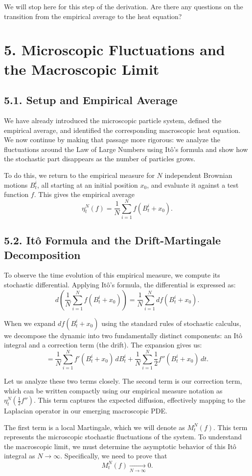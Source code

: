 \documentclass[11pt]{article}
\theoremstyle{definition}
\theoremstyle{remark}
\begin{document}
We will stop here for this step of the derivation. Are there any questions on the transition from the empirical average to the heat equation?

\section*{5. Microscopic Fluctuations and the Macroscopic Limit}
\subsection*{5.1. Setup and Empirical Average}
We have already introduced the microscopic particle system, defined the empirical average, and identified the corresponding macroscopic heat equation. We now continue by making that passage more rigorous: we analyze the fluctuations around the Law of Large Numbers using It\^o's formula and show how the stochastic part disappears as the number of particles grows.

To do this, we return to the empirical measure for $N$ independent Brownian motions $B_t^i$, all starting at an initial position $x_0$, and evaluate it against a test function $f$. This gives the empirical average
\[
\eta_t^N(f)=\frac{1}{N}\sum_{i=1}^N f(B_t^i+x_0).
\]

\subsection*{5.2. It\^o Formula and the Drift-Martingale Decomposition}
To observe the time evolution of this empirical measure, we compute its stochastic differential. Applying It\^o's formula, the differential is expressed as:
\[
d\!\left(
\frac{1}{N}\sum_{i=1}^N f(B_t^i+x_0)
\right)
=
\frac{1}{N}\sum_{i=1}^N df(B_t^i+x_0).
\]

When we expand $df(B_t^i+x_0)$ using the standard rules of stochastic calculus, we decompose the dynamic into two fundamentally distinct components: an It\^o integral and a correction term (the drift). The expansion gives us:
\[
=
\frac{1}{N}\sum_{i=1}^N f'(B_t^i+x_0)\,dB_t^i
+
\frac{1}{N}\sum_{i=1}^N \frac{1}{2}f''(B_t^i+x_0)\,dt.
\]

Let us analyze these two terms closely. The second term is our correction term, which can be written compactly using our empirical measure notation as $\eta_t^N\!\left(\frac{1}{2}f''\right)$. This term captures the expected diffusion, effectively mapping to the Laplacian operator in our emerging macroscopic PDE.

The first term is a local Martingale, which we will denote as $M_t^N(f)$. This term represents the microscopic stochastic fluctuations of the system. To understand the macroscopic limit, we must determine the asymptotic behavior of this It\^o integral as $N\to\infty$. Specifically, we need to prove that
\[
M_t^N(f)\xrightarrow[N\to\infty]{}0.
\]
\end{document}
